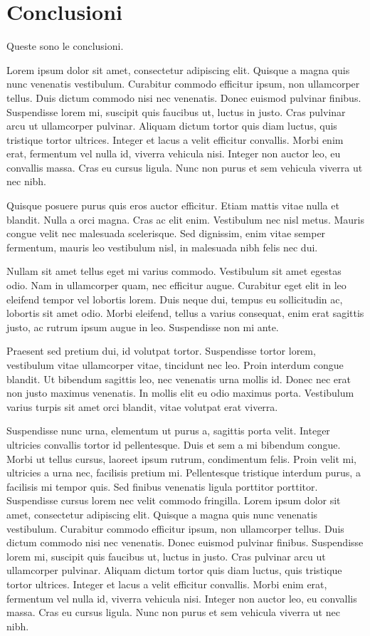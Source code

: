 
\chapter{Conclusioni}

Queste sono le
conclusioni.

Lorem ipsum dolor sit amet, consectetur adipiscing elit. Quisque a magna quis nunc venenatis vestibulum. Curabitur commodo efficitur ipsum, non ullamcorper tellus. Duis dictum commodo nisi nec venenatis. Donec euismod pulvinar finibus. Suspendisse lorem mi, suscipit quis faucibus ut, luctus in justo. Cras pulvinar arcu ut ullamcorper pulvinar. Aliquam dictum tortor quis diam luctus, quis tristique tortor ultrices. Integer et lacus a velit efficitur convallis. Morbi enim erat, fermentum vel nulla id, viverra vehicula nisi. Integer non auctor leo, eu convallis massa. Cras eu cursus ligula. Nunc non purus et sem vehicula viverra ut nec nibh.

Quisque posuere purus quis eros auctor efficitur. Etiam mattis vitae nulla et blandit. Nulla a orci magna. Cras ac elit enim. Vestibulum nec nisl metus. Mauris congue velit nec malesuada scelerisque. Sed dignissim, enim vitae semper fermentum, mauris leo vestibulum nisl, in malesuada nibh felis nec dui.

Nullam sit amet tellus eget mi varius commodo. Vestibulum sit amet egestas odio. Nam in ullamcorper quam, nec efficitur augue. Curabitur eget elit in leo eleifend tempor vel lobortis lorem. Duis neque dui, tempus eu sollicitudin ac, lobortis sit amet odio. Morbi eleifend, tellus a varius consequat, enim erat sagittis justo, ac rutrum ipsum augue in leo. Suspendisse non mi ante.

Praesent sed pretium dui, id volutpat tortor. Suspendisse tortor lorem, vestibulum vitae ullamcorper vitae, tincidunt nec leo. Proin interdum congue blandit. Ut bibendum sagittis leo, nec venenatis urna mollis id. Donec nec erat non justo maximus venenatis. In mollis elit eu odio maximus porta. Vestibulum varius turpis sit amet orci blandit, vitae volutpat erat viverra.

Suspendisse nunc urna, elementum ut purus a, sagittis porta velit. Integer ultricies convallis tortor id pellentesque. Duis et sem a mi bibendum congue. Morbi ut tellus cursus, laoreet ipsum rutrum, condimentum felis. Proin velit mi, ultricies a urna nec, facilisis pretium mi. Pellentesque tristique interdum purus, a facilisis mi tempor quis. Sed finibus venenatis ligula porttitor porttitor. Suspendisse cursus lorem nec velit commodo fringilla.
Lorem ipsum dolor sit amet, consectetur adipiscing elit. Quisque a magna quis nunc venenatis vestibulum. Curabitur commodo efficitur ipsum, non ullamcorper tellus. Duis dictum commodo nisi nec venenatis. Donec euismod pulvinar finibus. Suspendisse lorem mi, suscipit quis faucibus ut, luctus in justo. Cras pulvinar arcu ut ullamcorper pulvinar. Aliquam dictum tortor quis diam luctus, quis tristique tortor ultrices. Integer et lacus a velit efficitur convallis. Morbi enim erat, fermentum vel nulla id, viverra vehicula nisi. Integer non auctor leo, eu convallis massa. Cras eu cursus ligula. Nunc non purus et sem vehicula viverra ut nec nibh.

